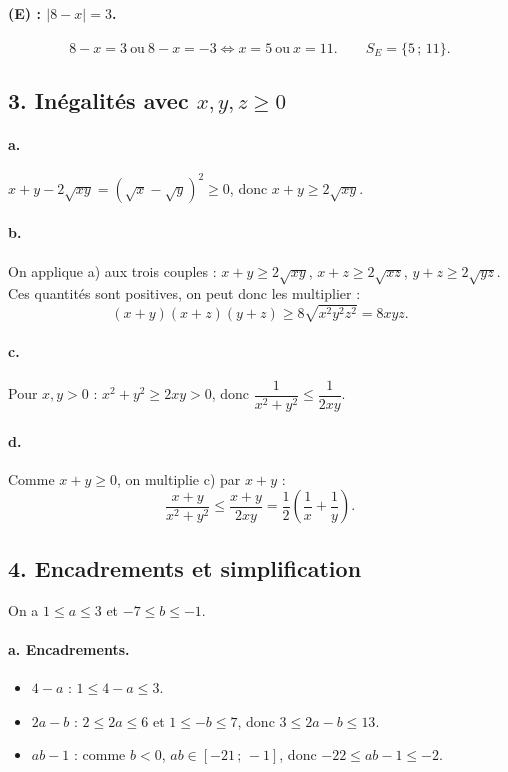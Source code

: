 \documentclass[11pt,a4paper]{article}
\begin{document}
\paragraph{(E) : $\lvert8-x\rvert=3$.}
\[
8-x=3\ \text{ou}\ 8-x=-3\iff x=5\ \text{ou}\ x=11.\qquad S_E=\{5\,;\,11\}.
\]

\subsection*{3. In\'egalit\'es avec $x,y,z\ge0$}

\paragraph{a.} $x+y-2\sqrt{xy}=(\sqrt x-\sqrt y)^2\ge0$, donc $x+y\ge2\sqrt{xy}$.

\paragraph{b.} On applique a) aux trois couples :
$x+y\ge2\sqrt{xy}$, $x+z\ge2\sqrt{xz}$, $y+z\ge2\sqrt{yz}$.
Ces quantit\'es sont positives, on peut donc les multiplier :
\[
(x+y)(x+z)(y+z)\ge8\sqrt{x^2y^2z^2}=8xyz.
\]

\paragraph{c.} Pour $x,y>0$ : $x^2+y^2\ge2xy>0$, donc $\dfrac{1}{x^2+y^2}\le\dfrac{1}{2xy}$.

\paragraph{d.} Comme $x+y\ge0$, on multiplie c) par $x+y$ :
\[
\frac{x+y}{x^2+y^2}\le\frac{x+y}{2xy}=\frac12\left(\frac1x+\frac1y\right).
\]

\subsection*{4. Encadrements et simplification}

On a $1\le a\le3$ et $-7\le b\le-1$.

\paragraph{a. Encadrements.}
\begin{itemize}
  \item $4-a$ : $1\le4-a\le3$.
  \item $2a-b$ : $2\le2a\le6$ et $1\le-b\le7$, donc $3\le2a-b\le13$.
  \item $ab-1$ : comme $b<0$, $ab\in[-21\,;\,-1]$, donc $-22\le ab-1\le-2$.
\end{itemize}
\end{document}
